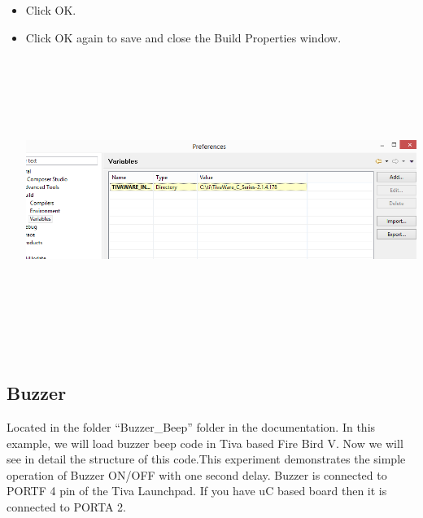 \documentclass[a4paper,10pt,oneside]{article}
\begin{document}
\begin{itemize}
						\item  Click OK.
						\item  Click OK again to save and close
						the Build Properties window.\\
						\includegraphics[width=20cm,height=10cm]{AddVariables9}
					\end{itemize}
		\subsection{\huge \textbf{Buzzer}}
		
			Located in the folder “Buzzer\_Beep” folder in the documentation.
			In this example, we will load buzzer beep code in Tiva based Fire Bird V. Now we will see in detail the structure of this code.This experiment demonstrates the simple operation of Buzzer ON/OFF with one second delay.
			Buzzer is connected to PORTF 4 pin of the Tiva Launchpad. If you have uC based board then it is connected to PORTA 2.
		
\end{document}
